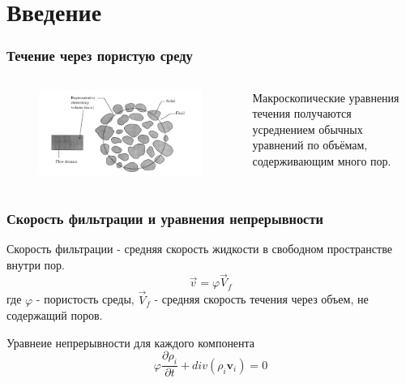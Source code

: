 \section{Введение}

\begin{frame}
    \frametitle{Течение через пористую среду}

    \begin{columns}
    \begin{column}{0.6\textwidth}
        \begin{figure}[H]
            \centering
            \includegraphics[width=\textwidth]
            {img/porous-medium.png}
        \end{figure}
    \end{column}
    \begin{column}{0.4\textwidth}
            Макроскопические уравнения течения получаются
            усреднением обычных уравнений по объёмам,
            содерживающим много пор.
    \end{column}
    \end{columns}

\end{frame}

\begin{frame}
    \frametitle{Скорость фильтрации и уравнения непрерывности}
    Скорость фильтрации - средняя скорость жидкости в свободном
    пространстве внутри пор.
    \[
    \vec v = \varphi \vec V_f
    \] 
    где \(\varphi\) - пористость среды, 
    \(\vec V_f\) - средняя скорость течения через объем, не
    содержащий поров.

    \begin{block}{Уравнеие непрерывности для каждого компонента}
        \begin{equation}
            \varphi \frac{\partial \rho_i}{\partial t}
            + div (\rho_i \bm{v}_i) = 0
        \end{equation}
    \end{block}
\end{frame}

